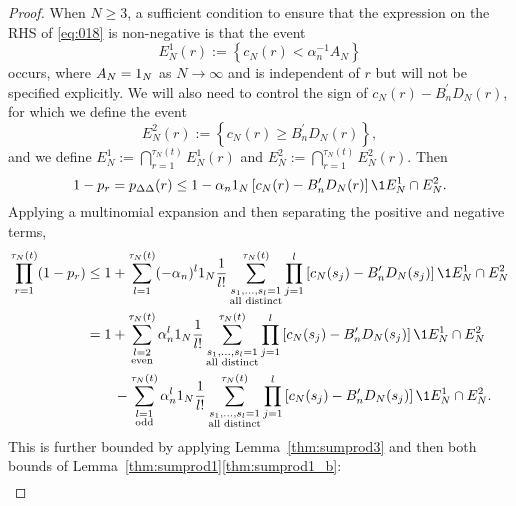 \begin{proof}
When $N \geq 3$, a sufficient condition to ensure that the expression on the RHS of \eqref{eq:018} is non-negative is that the event
\begin{equation}\label{eq:defn_E1}
E_N^{1}(r) := \left\{ c_N(r) < \alpha_n^{-1} A_N \right\} 
\end{equation}
occurs, where $A_N = 1_N$ as $N\to\infty$ and is independent of $r$ but will not be specified explicitly.
We will also need to control the sign of $c_N(r) - B_n^\prime D_N(r)$, for which we define the event
\begin{equation}\label{eq:defn_E2}
E_N^2(r) := \left\{ c_N(r) \geq B_n^\prime D_N(r) \right\} ,
\end{equation}
and we define $E_N^1 := \bigcap_{r=1}^{\tau_N(t)} E_N^1(r)$ and $E_N^2 := \bigcap_{r=1}^{\tau_N(t)} E_N^2(r)$.
Then
\begin{equation*}
1-p_r
= p_{\Delta\Delta}(r) \leq 1 - \alpha_n \ON 
        \left[ c_N(r) - B_n^\prime D_N(r) \right] \1{E_N^1 \cap E_N^2} .
\end{equation*}
Applying a multinomial expansion and then separating the positive and negative terms,
\begin{align}
\prod_{r=1}^{\tau_N(t)} (1-p_r)
&\leq 1 + \sum_{l=1}^{\tau_N(t)} (- \alpha_n)^l \ON 
        \frac{1}{l!} \sum_{\substack{ s_1, \dots, s_l =1 \\ \text{all distinct} }}^{\tau_N(t)}
        \prod_{j=1}^l
        \left[ c_N(s_j) - B_n^\prime D_N(s_j) \right] \1{E_N^1 \cap E_N^2} \notag\\
&= 1 + \sum_{\substack{l=2 \\ \text{even} }}^{\tau_N(t)} 
        \alpha_n^l \ON \frac{1}{l!} 
        \sum_{\substack{ s_1, \dots, s_l =1 \\ \text{all distinct} }}^{\tau_N(t)}
        \prod_{j=1}^l
        \left[ c_N(s_j) - B_n^\prime D_N(s_j) \right] \1{E_N^1 \cap E_N^2} \notag\\
    &\qquad- \sum_{\substack{l=1 \\ \text{odd} }}^{\tau_N(t)} 
        \alpha_n^l \ON \frac{1}{l!} 
        \sum_{\substack{ s_1, \dots, s_l =1 \\ \text{all distinct} }}^{\tau_N(t)}
        \prod_{j=1}^l
        \left[ c_N(s_j) - B_n^\prime D_N(s_j) \right] \1{E_N^1 \cap E_N^2} .
        \label{eq:019}
\end{align}
This is further bounded by applying Lemma~\ref{thm:sumprod3} and then both bounds of Lemma~\ref{thm:sumprod1}\ref{thm:sumprod1_b}:
\begin{align*}

\end{align*}
\end{proof}
